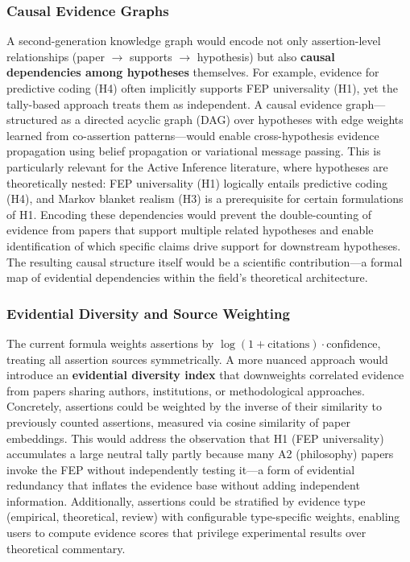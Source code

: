 \documentclass[
  english,
]{article}
\begin{document}
\subsubsection{Causal Evidence Graphs}\label{causal-evidence-graphs}

A second-generation knowledge graph would encode not only
assertion-level relationships (paper \texorpdfstring{\ensuremath{\to}}{->} supports \texorpdfstring{\ensuremath{\to}}{->} hypothesis) but also
\textbf{causal dependencies among hypotheses} themselves. For example,
evidence for predictive coding (H4) often implicitly supports FEP
universality (H1), yet the tally-based approach treats them as
independent. A causal evidence graph---structured as a directed acyclic
graph (DAG) over hypotheses with edge weights learned from co-assertion
patterns---would enable cross-hypothesis evidence propagation using
belief propagation or variational message passing. This is particularly
relevant for the Active Inference literature, where hypotheses are
theoretically nested: FEP universality (H1) logically entails predictive
coding (H4), and Markov blanket realism (H3) is a prerequisite for
certain formulations of H1. Encoding these dependencies would prevent
the double-counting of evidence from papers that support multiple
related hypotheses and enable identification of which specific claims
drive support for downstream hypotheses. The resulting causal structure
itself would be a scientific contribution---a formal map of evidential
dependencies within the field's theoretical architecture.

\subsubsection{Evidential Diversity and Source
Weighting}\label{evidential-diversity-and-source-weighting}

The current formula weights assertions by
\(\log(1 + \text{citations}) \cdot \text{confidence}\), treating all
assertion sources symmetrically. A more nuanced approach would introduce
an \textbf{evidential diversity index} that downweights correlated
evidence from papers sharing authors, institutions, or methodological
approaches. Concretely, assertions could be weighted by the inverse of
their similarity to previously counted assertions, measured via cosine
similarity of paper embeddings. This would address the observation that
H1 (FEP universality) accumulates a large neutral tally partly because
many A2 (philosophy) papers invoke the FEP without independently testing
it---a form of evidential redundancy that inflates the evidence base
without adding independent information. Additionally, assertions could
be stratified by evidence type (empirical, theoretical, review) with
configurable type-specific weights, enabling users to compute evidence
scores that privilege experimental results over theoretical commentary.
\end{document}
